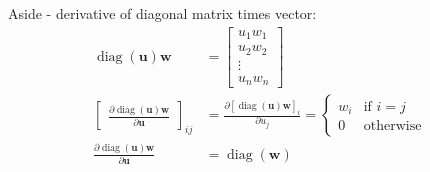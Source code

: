 \documentclass[11pt]{article}
\DeclareMathOperator{\diag}{\operatorname{diag}}%
\newcommand{\pd}[2]{\frac{\partial #1}{\partial #2}} %
\begin{document}
Aside - derivative of diagonal matrix times vector:
\begin{align*}
    \diag(\mathbf{u})\mathbf{w} 
    &= \begin{bmatrix}
        u_1 w_1 \\
        u_2 w_2 \\
        \vdots \\
        u_n w_n
    \end{bmatrix} \\
    \begin{bmatrix}
        \pd{\diag(\mathbf{u})\mathbf{w}}{\mathbf{u}}
    \end{bmatrix}_{ij} &= \pd{[\diag(\mathbf{u})\mathbf{w}]_i}{u_j} = \begin{cases*}
        w_i & \text{if } i = j \\
        0 & \text{otherwise}
    \end{cases*} \\
    \pd{\diag(\mathbf{u})\mathbf{w}}{\mathbf{u}} &= \diag(\mathbf{w}) \\
\end{align*}
\end{document}
